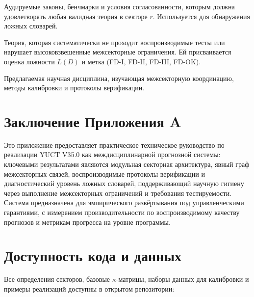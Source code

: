 \documentclass[11pt,a4paper]{article}
\begin{document}
\begin{description}[leftmargin=3cm,style=nextline]
		\item[$P_r$ (Набор ограничений)] 
		Аудируемые законы, бенчмарки и условия согласованности, которым должна удовлетворять любая валидная теория в секторе $r$. Используется для обнаружения ложных словарей.
		
		\item[Ложный словарь] 
		Теория, которая систематически не проходит воспроизводимые тесты или нарушает высоковзвешенные межсекторные ограничения. Ей присваивается оценка ложности $L(D)$ и метка (FD-I, FD-II, FD-III, FD-OK).
		
		\item[Координационная системология] 
		Предлагаемая научная дисциплина, изучающая межсекторную координацию, методы калибровки и протоколы верификации.
		
	\end{description}
	
	\section*{Заключение Приложения A}
	
	Это приложение предоставляет практическое техническое руководство по реализации YUCT V35.0 как междисциплинарной прогнозной системы: ключевыми результатами являются модульная секторная архитектура, явный граф межсекторных связей, воспроизводимые протоколы верификации и диагностический уровень ложных словарей, поддерживающий научную гигиену через выполнение межсекторных ограничений и требования тестируемости. Система предназначена для эмпирического развёртывания под управленческими гарантиями, с измерением производительности по воспроизводимому качеству прогнозов и метрикам прогресса на уровне программы.
	
	\section*{Доступность кода и данных}
	
	Все определения секторов, базовые $\kappa$-матрицы, наборы данных для калибровки и примеры реализаций доступны в открытом репозитории:
	
\end{document}
